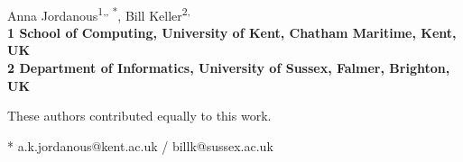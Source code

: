 \documentclass[10pt,letterpaper]{article}
\date{}
\begin{document}
\vspace*{0.35in}

\begin{flushleft}
{\Large
\textbf{}
}
\newline
\\
Anna Jordanous\textsuperscript{1,\Yinyang, *},
Bill Keller\textsuperscript{2,\Yinyang}
\\
\bigskip
\bf{1} School of Computing, University of Kent, Chatham Maritime, Kent, UK
\\
\bf{2} Department of Informatics, University of Sussex, Falmer, Brighton, UK
\\
\bigskip

% 
%
\Yinyang These authors contributed equally to this work.





* a.k.jordanous@kent.ac.uk / billk@sussex.ac.uk 

\end{flushleft}
\end{document}
